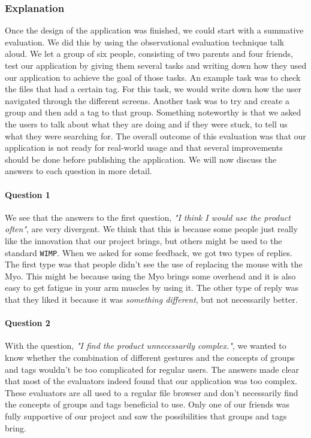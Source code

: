 \documentclass{article}
\begin{document}
\subsubsection{Explanation}

Once the design of the application was finished, we could start with a summative evaluation. We did this by using the observational evaluation technique talk aloud. We let a group of six people, consisting of two parents and four friends, test our application by giving them several tasks and writing down how they used our application to achieve the goal of those tasks. An example task was to check the files that had a certain tag. For this task, we would write down how the user navigated through the different screens. Another task was to try and create a group and then add a tag to that group. Something noteworthy is that we asked the users to talk about what they are doing and if they were stuck, to tell us what they were searching for. The overall outcome of this evaluation was that our application is not ready for real-world usage and that several improvements should be done before publishing the application. We will now discuss the answers to each question in more detail.

\paragraph{Question 1}

We see that the answers to the first question, \textit{"I think I would use the product often"}, are very divergent. We think that this is because some people just really like the innovation that our project brings, but others might be used to the standard \texttt{WIMP}. When we asked for some feedback, we got two types of replies. The first type was that people didn't see the use of replacing the mouse with the Myo. This might be because using the Myo brings some overhead and it is also easy to get fatigue in your arm muscles by using it. The other type of reply was that they liked it because it was \textit{something different}, but not necessarily better.

\paragraph{Question 2}

With the question, \textit{"I find the product unnecessarily complex."}, we wanted to know whether the combination of different gestures and the concepts of groups and tags wouldn't be too complicated for regular users. The answers made clear that most of the evaluators indeed found that our application was too complex. These evaluators are all used to a regular file browser and don't necessarily find the concepts of groups and tags beneficial to use. Only one of our friends was fully supportive of our project and saw the possibilities that groups and tags bring.
\end{document}
